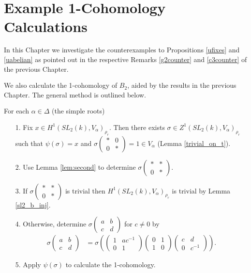 
\chapter{Example 1-Cohomology Calculations}
\label{Chapter6}
In this Chapter we investigate the counterexamples to Propositions \ref{ufixes} and \ref{uabelian} as pointed out in the respective Remarks \ref{g2counter} and \ref{c3counter} of the previous Chapter.

We also calculate the 1-cohomology of $B_2$, aided by the results in the previous Chapter. The general method is outlined below.

For each $\alpha \in \Delta$ (the simple roots)
	\begin{itemize}
	\item[1.] Fix $x\in H^1(SL_2(k), V_\alpha)_{\rho_r}$. Then there exists $\sigma\in Z^1(SL_2(k), V_\alpha)_{\rho_r}$ such that $\psi(\sigma) = x$ and $\sigma\left(\begin{matrix}* & 0\\0 & *\end{matrix}\right) = 1 \in V_\alpha$ (Lemma \ref{trivial_on_t}).
	\item[2.] Use Lemma \ref{lem:second} to determine $\sigma\left(\begin{matrix}* & *\\0 & *\end{matrix}\right)$. 
	\item[3.] If $\sigma\left(\begin{matrix}* & *\\0 & *\end{matrix}\right)$ is trivial then $H^1(SL_2(k), V_\alpha)_{\rho_r}$ is trivial by Lemma \ref{sl2_b_inj}.
	\item[4.] Otherwise, determine $\sigma\left(\begin{matrix}a & b\\c & d\end{matrix}\right)$ for $c \neq 0$ by
	\begin{align*}
	\sigma\left(\begin{matrix}a & b\\c & d\end{matrix}\right) &= \sigma\left(
			\left(\begin{matrix}1 & ac^{-1}\\0 & 1\end{matrix}\right)
			\left(\begin{matrix}0 & 1\\1 & 0\end{matrix}\right)
			\left(\begin{matrix}c & d\\0 & c^{-1}\end{matrix}\right)
			\right).
	\end{align*}
	\item[5.] Apply $\psi(\sigma)$ to calculate the 1-cohomology.
	\end{itemize}

